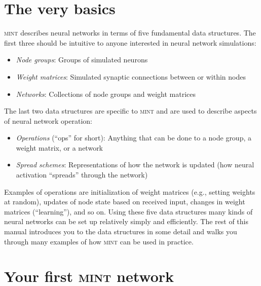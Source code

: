 \documentclass[11pt,letterpaper]{memoir}
\newcommand{\mint}{{\scshape\sffamily mint}\xspace}
\begin{document}
\section{The very basics}
\label{sec:the-very-basics}

\mint describes neural networks in terms of five fundamental data
structures. The first three should be intuitive to anyone interested
in neural network simulations:
\begin{itemize}
\item \textit{Node groups}: Groups of simulated neurons
\item \textit{Weight matrices}: Simulated synaptic connections between
  or within nodes
\item \textit{Networks}: Collections of node groups and weight
  matrices
\end{itemize}
The last two data structures are specific to \mint and are used to
describe aspects of neural network operation:
\begin{itemize}
\item \textit{Operations} (``ops'' for short): Anything that can be
  done to a node group, a weight matrix, or a network
\item\textit{Spread schemes}: Representations of how the network
  is updated (how neural activation ``spreads'' through the network)
\end{itemize}
Examples of operations are initialization of weight matrices (e.g.,
setting weights at random), updates of node state based on received
input, changes in weight matrices (``learning''), and so on. Using
these five data structures many kinds of neural networks can be set up
relatively simply and efficiently. The rest of this manual introduces
you to the data structures in some detail and walks you through many
examples of how \mint can be used in practice.

\section{Your first \mint network}
\label{sec:first-mint}
\end{document}
